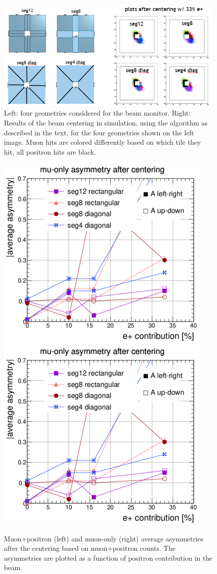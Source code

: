 \begin{refsection}
        \begin{figure}
            \centering
            \includegraphics[width=0.8\linewidth]{Figures/muEDM/BeamMonitor/BeamMonConfigurations.png}
            \caption{Left: four geometries considered for the beam monitor. Right: Results of the beam centering in simulation, using the algorithm as described in the text, for the four geometries shown on the left image. Muon hits are colored differently based on which tile they hit, all positron hits are black.}
            \label{fig:BeamMonSimCentering}
        \end{figure}
        
        \begin{figure}
            \centering
            \includegraphics[width=0.4\linewidth]{Figures/muEDM/BeamMonitor/Mu+OnlyAsymm.png}
               \hspace{0.8cm}
            \includegraphics[width=0.4\linewidth]{Figures/muEDM/BeamMonitor/Mu-OnlyAsymm.png}
            \caption{Muon+positron (left) and muon-only (right) average asymmetries after the centering based on muon+positron counts. The asymmetries are plotted as a function of positron contribution in the beam.}
            \label{fig:BeamMonAsymmSim}
        \end{figure}
        

\end{refsection}
